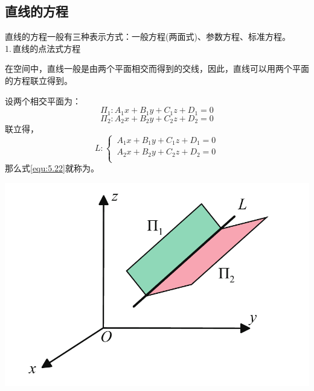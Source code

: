 \subsection{直线的方程}
直线的方程一般有三种表示方式：一般方程(两面式)、参数方程、标准方程。\\
1.$\,$直线的点法式方程
\par 在空间中，直线一般是由两个平面相交而得到的交线，因此，直线可以用两个平面的方程联立得到。\\

\noindent
\begin{minipage}{0.6\linewidth}
 设两个相交平面为：
\begin{equation}
	\nonumber
	\Pi_1:A_1x+B_1y+C_1z+D_1=0
\end{equation}
\begin{equation}
	\nonumber
\Pi_2: A_2x+B_2y+C_2z+D_2=0
\end{equation}
联立得，
\begin{equation}
	L:\begin{cases}
	\, A_1x+B_1y+C_1z+D_1=0\\
	\, 	A_2x+B_2y+C_2z+D_2=0\\
		\end{cases}
	\label{equ:5.22}
\end{equation}
那么式\eqref{equ:5.22}就称为。
\vspace*{0.5em}
\end{minipage}
\begin{minipage}{0.4\linewidth}
	\centering
	\includegraphics[width = 0.85\linewidth]{pic/C-5/line}
	\vspace*{-1em}
	\label{直线的点法式方程}
\end{minipage}

